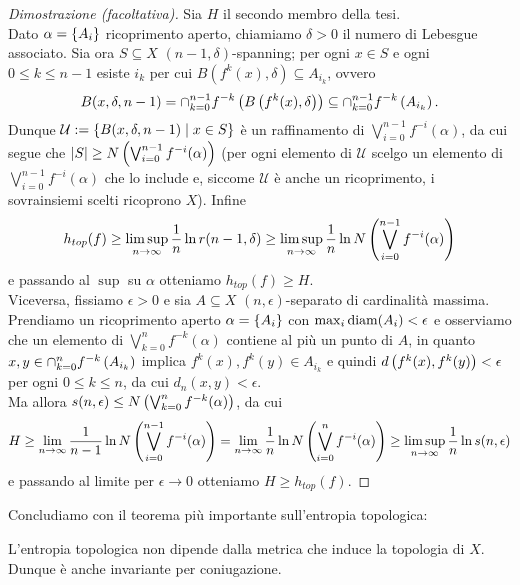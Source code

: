 \begin{proof}[Dimostrazione (facoltativa)]Sia $H$ il secondo membro della tesi. \\
Dato $\alpha=\left\{A_i\right\}$ ricoprimento aperto, chiamiamo $\delta>0$ il numero di Lebesgue
associato. Sia ora $S\subseteq X$ $(n-1,\delta)$-spanning; per ogni $x\in S$ e ogni $0\le k\le n-1$ esiste $i_k$ per cui
$B(f^k(x),\delta)\subseteq A_{i_k}$, ovvero
\[ B(x,\delta,n-1)=\cap_{k=0}^{n-1} f^{-k}\left(B\left(f^k(x),\delta\right)\right)\subseteq\cap_{k=0}^{n-1} f^{-k}\left(A_{i_k}\right). \]
Dunque $\mathcal{U}:=\left\{B(x,\delta,n-1)\mid x\in S\right\}$ è un raffinamento di $\bigvee_{i=0}^{n-1}f^{-i}(\alpha)$,
da cui segue che $\left|S\right|\ge N\left(\bigvee_{i=0}^{n-1}f^{-i}(\alpha)\right)$ (per ogni elemento di $\mathcal{U}$
scelgo un elemento di $\bigvee_{i=0}^{n-1}f^{-i}(\alpha)$ che lo include e, siccome $\mathcal{U}$ è anche un ricoprimento,
i sovrainsiemi scelti ricoprono $X$). Infine
\[ h_{top}(f)\ge\limsup_{n\to\infty}\frac{1}{n}\ln r(n-1,\delta)
\ge\limsup_{n\to\infty}\frac{1}{n}\ln N\left(\bigvee_{i=0}^{n-1}f^{-i}(\alpha)\right) \]
e passando al $\sup$ su $\alpha$ otteniamo $h_{top}(f)\ge H$. \\
Viceversa, fissiamo $\epsilon>0$ e sia $A\subseteq X$ $(n,\epsilon)$-separato di cardinalità massima.
Prendiamo un ricoprimento aperto $\alpha=\left\{A_i\right\}$ con $\max_i\operatorname{diam}(A_i)<\epsilon$ e osserviamo
che un elemento di $\bigvee_{k=0}^n f^{-k}(\alpha)$ contiene al più un punto di $A$,
in quanto $x,y\in\cap_{k=0}^n f^{-k}\left(A_{i_k}\right)$ implica $f^k(x),f^k(y)\in A_{i_k}$ e quindi $d\left(f^k(x),f^k(y)\right)<\epsilon$
per ogni $0\le k\le n$, da cui $d_n(x,y)<\epsilon$. \\
Ma allora $s(n,\epsilon)\le N\left(\bigvee_{k=0}^n f^{-k}(\alpha)\right)$, da cui
\[ H\ge\lim_{n\to\infty}\frac{1}{n-1}\ln N\left(\bigvee_{i=0}^{n-1}f^{-i}(\alpha)\right)
=\lim_{n\to\infty}\frac{1}{n}\ln N\left(\bigvee_{i=0}^n f^{-i}(\alpha)\right)\ge\limsup_{n\to\infty}\frac{1}{n}\ln s(n,\epsilon) \]
e passando al limite per $\epsilon\to 0$ otteniamo $H\ge h_{top}(f)$.
\end{proof}

Concludiamo con il teorema più importante sull'entropia topologica:

\begin{teo}L'entropia topologica non dipende dalla metrica che induce la topologia di $X$.
Dunque è anche invariante per coniugazione.
\end{teo}

